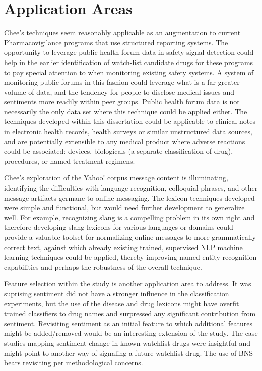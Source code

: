 \documentclass[twoside,11pt]{article}
\begin{document}
\section{Application Areas}
Chee's techniques seem reasonably applicable as an augmentation to current Pharmacovigilance programs that use structured reporting systems. The opportunity to leverage public health forum data in safety signal detection could help in the earlier identification of watch-list candidate drugs for these programs to pay special attention to when monitoring existing safety systems. A system of monitoring public forums in this fashion could leverage what is a far greater volume of data, and the tendency for people to disclose medical issues and sentiments more readily within peer groups. Public health forum data is not necessarily the only data set where this technique could be applied either. The techniques developed within this dissertation could be applicable to clinical notes in electronic health records, health surveys or similar unstructured data sources, and are potentially extensible to any medical product where adverse reactions could be associated: devices, biologicals (a separate classification of drug), procedures, or named treatment regimens.

Chee's exploration of the Yahoo! corpus message content is illuminating, identifying the difficulties with language recognition, colloquial phrases, and other message artifacts germane to online messaging. The lexicon techniques developed were simple and functional, but would need further development to generalize well. For example, recognizing slang is a compelling problem in its own right and therefore developing slang lexicons for various languages or domains could provide a valuable toolset for normalizing online messages to more grammatically correct text, against which already existing trained, supervised NLP machine learning techniques could be applied, thereby improving named entity recognition capabilities and perhaps the robustness of the overall technique.

Feature selection within the study is another application area to address. It was suprising sentiment did not have a stronger influence in the classification experiments, but the use of the disease and drug lexicons might have overfit trained classifiers to drug names and surpressed any significant contribution from sentiment. Revisiting sentiment as an initial feature to which additional features might be added/removed would be an interesting extension of the study. The case studies mapping sentiment change in known watchlist drugs were insightful and might point to another way of signaling a future watchlist drug. The use of BNS bears revisiting per methodological concerns.
\end{document}
